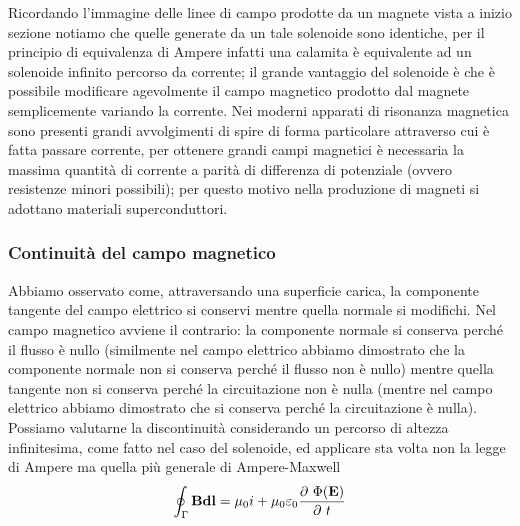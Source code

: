 \documentclass[
10pt, %
a4paper, %
oneside, %
headinclude,footinclude, %
BCOR5mm, %
]{scrartcl}
\begin{document}
\FloatBarrier
Ricordando l'immagine delle linee di campo prodotte da un magnete vista a inizio sezione notiamo che quelle generate da un tale solenoide sono identiche, per il principio di equivalenza di Ampere infatti una calamita è equivalente ad un solenoide infinito percorso da corrente; il grande vantaggio del solenoide è che è possibile modificare agevolmente il campo magnetico prodotto dal magnete semplicemente variando la corrente. Nei moderni apparati di risonanza magnetica sono presenti grandi avvolgimenti di spire di forma particolare attraverso cui è fatta passare corrente, per ottenere grandi campi magnetici è necessaria la massima quantità di corrente a parità di differenza di potenziale (ovvero resistenze minori possibili); per questo motivo nella produzione di magneti si adottano materiali superconduttori. 
\subsubsection{Continuità del campo magnetico}
Abbiamo osservato come, attraversando una superficie carica, la componente tangente del campo elettrico si conservi mentre quella normale si modifichi. Nel campo magnetico avviene il contrario: la componente normale si conserva perché il flusso è nullo (similmente nel campo elettrico abbiamo dimostrato che la componente normale non si conserva perché il flusso non è nullo) mentre quella tangente non si conserva perché la circuitazione non è nulla (mentre nel campo elettrico abbiamo dimostrato che si conserva perché la circuitazione è nulla). Possiamo valutarne la discontinuità considerando un percorso di altezza infinitesima, come fatto nel caso del solenoide, ed applicare sta volta non la legge di Ampere ma quella più generale di Ampere-Maxwell
\[\oint_{\Gamma}\mathbf{B}\mathbf{dl}=\mu_0 i + \mu_0\varepsilon_0 \frac{\partial\  \Phi(\mathbf{E})}{\partial\  t}\]
\end{document}
